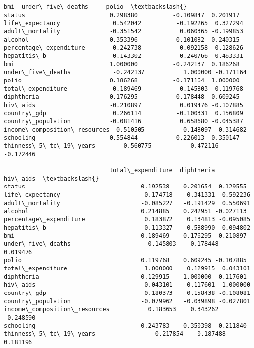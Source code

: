 \documentclass[11pt]{article}
\begin{document}
\begin{Verbatim}[commandchars=\\\{\}]
                                   bmi  under\_five\_deaths     polio  \textbackslash{}
status                        0.298380          -0.109847  0.201917
life\_expectancy               0.542042          -0.192265  0.327294
adult\_mortality              -0.351542           0.060365 -0.199853
alcohol                       0.353396          -0.101082  0.240315
percentage\_expenditure        0.242738          -0.092158  0.128626
hepatitis\_b                   0.143302          -0.240766  0.463331
bmi                           1.000000          -0.242137  0.186268
under\_five\_deaths            -0.242137           1.000000 -0.171164
polio                         0.186268          -0.171164  1.000000
total\_expenditure             0.189469          -0.145803  0.119768
diphtheria                    0.176295          -0.178448  0.609245
hiv\_aids                     -0.210897           0.019476 -0.107885
country\_gdp                   0.266114          -0.100331  0.156809
country\_population           -0.081416           0.658680 -0.045387
income\_composition\_resources  0.510505          -0.148097  0.314682
schooling                     0.554844          -0.226013  0.350147
thinness\_5\_to\_19\_years       -0.560775           0.472116 -0.172446

                              total\_expenditure  diphtheria  hiv\_aids  \textbackslash{}
status                                 0.192538    0.201654 -0.129555
life\_expectancy                        0.174718    0.341331 -0.592236
adult\_mortality                       -0.085227   -0.191429  0.550691
alcohol                                0.214885    0.242951 -0.027113
percentage\_expenditure                 0.183872    0.134813 -0.095085
hepatitis\_b                            0.113327    0.588990 -0.094802
bmi                                    0.189469    0.176295 -0.210897
under\_five\_deaths                     -0.145803   -0.178448  0.019476
polio                                  0.119768    0.609245 -0.107885
total\_expenditure                      1.000000    0.129915  0.043101
diphtheria                             0.129915    1.000000 -0.117601
hiv\_aids                               0.043101   -0.117601  1.000000
country\_gdp                            0.180373    0.158438 -0.108081
country\_population                    -0.079962   -0.039898 -0.027801
income\_composition\_resources           0.183653    0.343262 -0.248590
schooling                              0.243783    0.350398 -0.211840
thinness\_5\_to\_19\_years                -0.217854   -0.187488  0.181196


\end{Verbatim}
\end{document}
